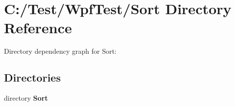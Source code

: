 \section{C\-:/\-Test/\-Wpf\-Test/\-Sort Directory Reference}
\label{dir_43c92ecf0902ef1892d8bd991fbcc710}
Directory dependency graph for Sort\-:
\subsection*{Directories}
\begin{DoxyCompactItemize}
\item 
directory {\bf Sort}
\end{DoxyCompactItemize}
